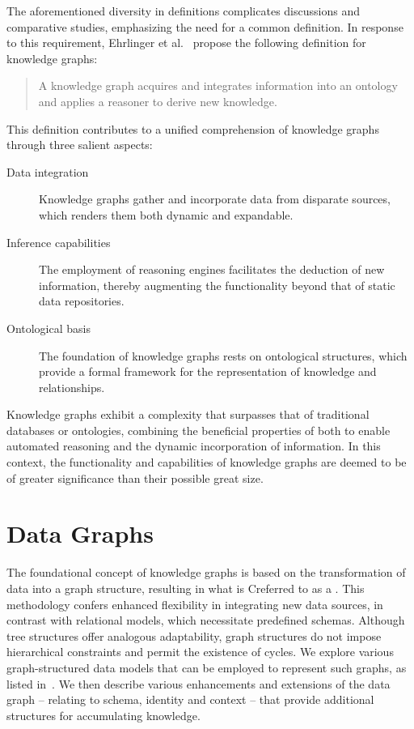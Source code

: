 The aforementioned diversity in definitions complicates discussions and comparative studies, emphasizing the need for a common definition. In response to this requirement, Ehrlinger et al.~\cite{Ehrlinger2016TowardsAD} propose the following definition for knowledge graphs:
\begin{center}
    \begin{quote}
        A knowledge graph acquires and integrates information into an ontology and applies a reasoner to derive new knowledge.
    \end{quote}
\end{center}
This definition contributes to a unified comprehension of knowledge graphs through three salient aspects:
\begin{description}
    \item[Data integration] Knowledge graphs gather and incorporate data from disparate sources, which renders them both dynamic and expandable.
    \item[Inference capabilities] The employment of reasoning engines facilitates the deduction of new information, thereby augmenting the functionality beyond that of static data repositories.
    \item[Ontological basis] The foundation of knowledge graphs rests on ontological structures, which provide a formal framework for the representation of knowledge and relationships.
\end{description}

Knowledge graphs exhibit a complexity that surpasses that of traditional databases or ontologies, combining the beneficial properties of both to enable automated reasoning and the dynamic incorporation of information. In this context, the functionality and capabilities of knowledge graphs are deemed to be of greater significance than their possible great size.

\section{Data Graphs}\label{data-graphs}
The foundational concept of knowledge graphs is based on the transformation of data into a graph structure, resulting in what is Creferred to as a . This methodology confers enhanced flexibility in integrating new data sources, in contrast with relational models, which necessitate predefined schemas. Although tree structures offer analogous adaptability, graph structures do not impose hierarchical constraints and permit the existence of cycles. We explore  various graph-structured data models that can be employed to represent such graphs, as listed in~\cite{Hogan2021KGs}. We then describe various enhancements and extensions of the data graph – relating to schema, identity and context – that provide additional structures for accumulating knowledge.

